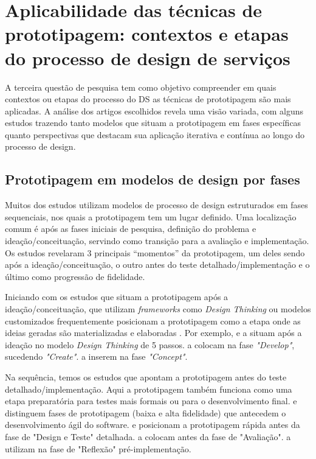 
\section{Aplicabilidade das técnicas de prototipagem: contextos e etapas do processo de design de serviços}

A terceira questão de pesquisa tem como objetivo compreender em quais contextos ou etapas do processo do DS as técnicas de prototipagem são mais aplicadas. A análise dos artigos escolhidos revela uma visão variada, com alguns estudos trazendo tanto modelos que situam a prototipagem em fases específicas quanto perspectivas que destacam sua aplicação iterativa e contínua ao longo do processo de design.

\subsection{Prototipagem em modelos de design por fases}

Muitos dos estudos utilizam modelos de processo de design estruturados em fases sequenciais, nos quais a prototipagem tem um lugar definido. Uma localização comum é após as fases iniciais de pesquisa, definição do problema e ideação/conceituação, servindo como transição para a avaliação e implementação. Os estudos revelaram 3 principais ``momentos'' da prototipagem, um deles sendo após a ideação/conceituação, o outro antes do teste detalhado/implementação e o último como progressão de fidelidade.

Iniciando com os estudos que situam a prototipagem após a ideação/conceituação, que utilizam \textit{frameworks} como \textit{Design Thinking} ou modelos customizados frequentemente posicionam a prototipagem como a etapa onde as ideias geradas são materializadas e elaboradas \cite{iriarte2023service, quintero2021interdisciplinary, leinonen2023service, schlott2024design, kumar2023rheumatology, lee2023industry, Kim2024}. Por exemplo,  e  a situam após a ideação no modelo \textit{Design Thinking} de 5 passos.  a colocam na fase \textit{"Develop"}, sucedendo \textit{"Create"}.  a inserem na fase \textit{"Concept"}.

Na sequência, temos os estudos que apontam a prototipagem antes do teste detalhado/implementação. Aqui a prototipagem também funciona como uma etapa preparatória para testes mais formais ou para o desenvolvimento final.  e   distinguem fases de prototipagem (baixa e alta fidelidade) que antecedem o desenvolvimento ágil do software.  e  posicionam a prototipagem rápida antes da fase de "Design e Teste" detalhada.  a colocam antes da fase de "Avaliação".  a utilizam na fase de "Reflexão" pré-implementação.

